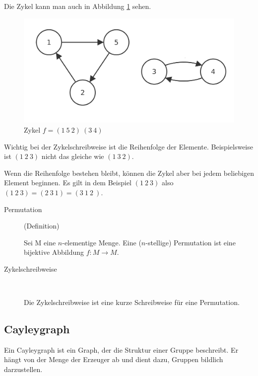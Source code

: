 \documentclass[12pt,a4paper, usenames, dvipsnames]{article}
\begin{document}
Die Zykel kann man auch in Abbildung \ref{10} sehen.
\begin{figure}[h]
\centering
\includegraphics[scale=0.13]{Zykel_152.png}
\caption{Zykel $f = (1 \ 5 \ 2)\ (3 \ 4)$}
\label{10}
\end{figure}


Wichtig bei der Zykelschreibweise ist die Reihenfolge der Elemente. Beispielsweise ist $(1 \ 2 \ 3)$ nicht das gleiche wie $(1 \ 3 \ 2)$. 

Wenn die Reihenfolge bestehen bleibt, können die Zykel aber bei jedem beliebigen Element beginnen. Es gilt in dem Beispiel $(1 \ 2 \ 3)$ also $(1 \ 2 \ 3) = (2 \ 3 \ 1) = (3\ 1 \ 2 \ )$.

{\begin{description}
\item[Permutation] (Definition)

Sei M eine $n$-elementige Menge. Eine ($n$-stellige) Permutation ist eine bijektive Abbildung $f: M \rightarrow M$.

\item[Zykelschreibweise] \ 

Die Zykelschreibweise ist eine kurze Schreibweise für eine Permutation.

\end{description}}

%
%
%
%
%
%
%
%
%
%

\subsection*{Cayleygraph} 
Ein Cayleygraph ist ein Graph, der die Struktur einer Gruppe beschreibt. Er hängt von der Menge der Erzeuger ab und dient dazu, Gruppen bildlich darzustellen.
\end{document}
